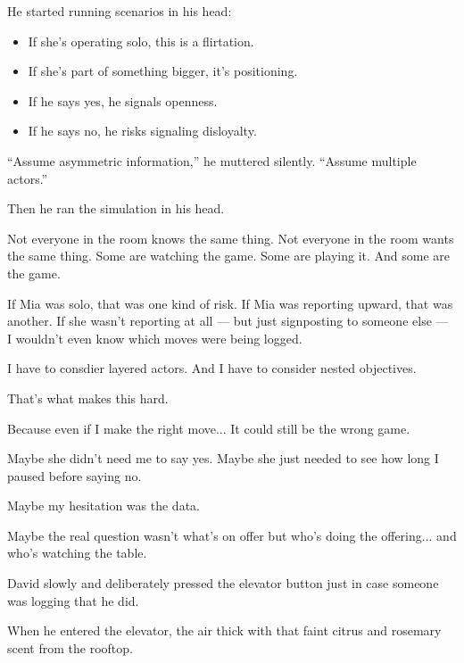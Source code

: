 \medskip

He started running scenarios in his head:

\begin{itemize}
    \item If she’s operating solo, this is a flirtation.
    \item If she’s part of something bigger, it’s positioning.
    \item If he says yes, he signals openness.
    \item If he says no, he risks signaling disloyalty.
\end{itemize}

``Assume asymmetric information,'' he muttered silently. ``Assume multiple actors.''

Then he ran the simulation in his head.

\begin{tcolorbox}[
    enhanced,
    sharp corners,
    boxrule=0pt,
    colback=gray!3,
    borderline west={2pt}{0pt}{gray!60}, %
    left=10pt,
    right=10pt,
    top=6pt,
    bottom=6pt,
    width=\linewidth,
    fontupper=\small\itshape
  ]
Not everyone in the room knows the same thing.
Not everyone in the room wants the same thing.
Some are watching the game.
Some are playing it.
And some are the game.

If Mia was solo, that was one kind of risk.
If Mia was reporting upward, that was another.
If she wasn’t reporting at all --- but just signposting to someone else --- I wouldn’t 
even know which moves were being logged.

I have to consdier layered actors. 
And I have to consider nested objectives.

That’s what makes this hard.

Because even if I make the right move...
It could still be the wrong game.

Maybe she didn’t need me to say yes.
Maybe she just needed to see how long I paused before saying no.

Maybe my hesitation was the data.

Maybe the real question wasn’t what’s on offer
but who’s doing the offering... and who’s watching the table.
\end{tcolorbox}

David slowly and deliberately pressed the elevator button just in case
someone was logging that he did.

When he entered the elevator, the air thick with that faint citrus and rosemary scent 
from the rooftop. 

